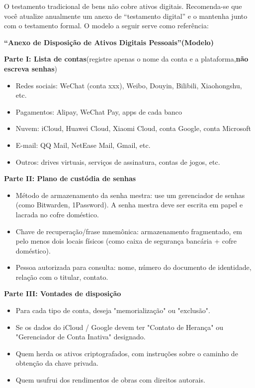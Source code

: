 O testamento tradicional de bens não cobre ativos digitais. Recomenda-se que você atualize anualmente um anexo de “testamento digital” e o mantenha junto com o testamento formal. O modelo a seguir serve como referência:

\textbf{“Anexo de Disposição de Ativos Digitais Pessoais”(Modelo)}\par

\textbf{Parte I: Lista de contas}(registre apenas o nome da conta e a plataforma,\textbf{não escreva senhas})

\begin{itemize}
  \item Redes sociais: WeChat (conta xxx), Weibo, Douyin, Bilibili, Xiaohongshu, etc.
  \item Pagamentos: Alipay, WeChat Pay, apps de cada banco
  \item Nuvem: iCloud, Huawei Cloud, Xiaomi Cloud, conta Google, conta Microsoft
  \item E-mail: QQ Mail, NetEase Mail, Gmail, etc.
  \item Outros: drives virtuais, serviços de assinatura, contas de jogos, etc.
\end{itemize}

\textbf{Parte II: Plano de custódia de senhas}

\begin{itemize}
  \item Método de armazenamento da senha mestra: use um gerenciador de senhas (como Bitwarden, 1Password). A senha mestra deve ser escrita em papel e lacrada no cofre doméstico.
  \item Chave de recuperação/frase mnemônica: armazenamento fragmentado, em pelo menos dois locais físicos (como caixa de segurança bancária + cofre doméstico).
  \item Pessoa autorizada para consulta: nome, número do documento de identidade, relação com o titular, contato.
\end{itemize}

\textbf{Parte III: Vontades de disposição}

\begin{itemize}
  \item Para cada tipo de conta, deseja "memorialização" ou "exclusão".
  \item Se os dados do iCloud / Google devem ter "Contato de Herança" ou "Gerenciador de Conta Inativa" designado.
  \item Quem herda os ativos criptografados, com instruções sobre o caminho de obtenção da chave privada.
  \item Quem usufrui dos rendimentos de obras com direitos autorais.
\end{itemize}

